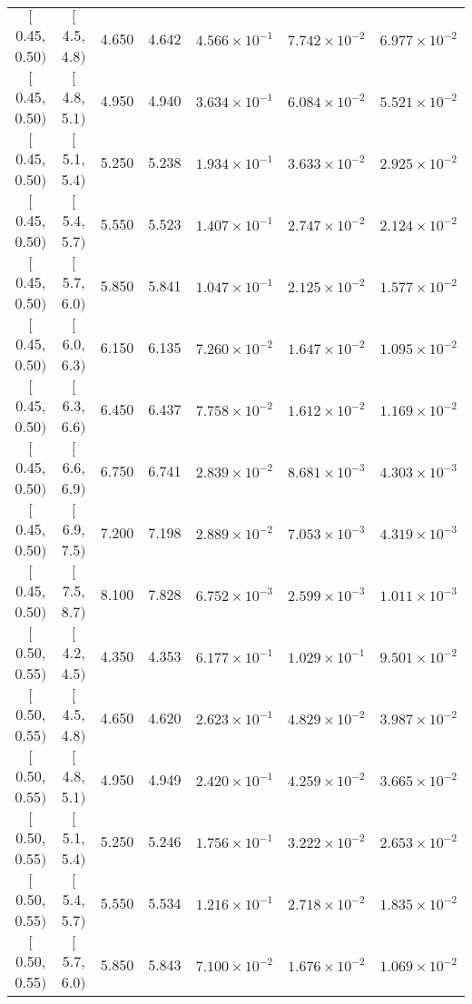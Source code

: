 \begin{longtable}{| c | c | c | c | c | c | c |}
$[$0.45, 0.50$)$ & $[$4.5, 4.8$)$ & 4.650 & 4.642 & $4.566 \times 10^{-1}$ & $7.742 \times 10^{-2}$ & $6.977 \times 10^{-2}$ \\
$[$0.45, 0.50$)$ & $[$4.8, 5.1$)$ & 4.950 & 4.940 & $3.634 \times 10^{-1}$ & $6.084 \times 10^{-2}$ & $5.521 \times 10^{-2}$ \\
$[$0.45, 0.50$)$ & $[$5.1, 5.4$)$ & 5.250 & 5.238 & $1.934 \times 10^{-1}$ & $3.633 \times 10^{-2}$ & $2.925 \times 10^{-2}$ \\
$[$0.45, 0.50$)$ & $[$5.4, 5.7$)$ & 5.550 & 5.523 & $1.407 \times 10^{-1}$ & $2.747 \times 10^{-2}$ & $2.124 \times 10^{-2}$ \\
$[$0.45, 0.50$)$ & $[$5.7, 6.0$)$ & 5.850 & 5.841 & $1.047 \times 10^{-1}$ & $2.125 \times 10^{-2}$ & $1.577 \times 10^{-2}$ \\
$[$0.45, 0.50$)$ & $[$6.0, 6.3$)$ & 6.150 & 6.135 & $7.260 \times 10^{-2}$ & $1.647 \times 10^{-2}$ & $1.095 \times 10^{-2}$ \\
$[$0.45, 0.50$)$ & $[$6.3, 6.6$)$ & 6.450 & 6.437 & $7.758 \times 10^{-2}$ & $1.612 \times 10^{-2}$ & $1.169 \times 10^{-2}$ \\
$[$0.45, 0.50$)$ & $[$6.6, 6.9$)$ & 6.750 & 6.741 & $2.839 \times 10^{-2}$ & $8.681 \times 10^{-3}$ & $4.303 \times 10^{-3}$ \\
$[$0.45, 0.50$)$ & $[$6.9, 7.5$)$ & 7.200 & 7.198 & $2.889 \times 10^{-2}$ & $7.053 \times 10^{-3}$ & $4.319 \times 10^{-3}$ \\
$[$0.45, 0.50$)$ & $[$7.5, 8.7$)$ & 8.100 & 7.828 & $6.752 \times 10^{-3}$ & $2.599 \times 10^{-3}$ & $1.011 \times 10^{-3}$ \\
\hline
$[$0.50, 0.55$)$ & $[$4.2, 4.5$)$ & 4.350 & 4.353 & $6.177 \times 10^{-1}$ & $1.029 \times 10^{-1}$ & $9.501 \times 10^{-2}$ \\
$[$0.50, 0.55$)$ & $[$4.5, 4.8$)$ & 4.650 & 4.620 & $2.623 \times 10^{-1}$ & $4.829 \times 10^{-2}$ & $3.987 \times 10^{-2}$ \\
$[$0.50, 0.55$)$ & $[$4.8, 5.1$)$ & 4.950 & 4.949 & $2.420 \times 10^{-1}$ & $4.259 \times 10^{-2}$ & $3.665 \times 10^{-2}$ \\
$[$0.50, 0.55$)$ & $[$5.1, 5.4$)$ & 5.250 & 5.246 & $1.756 \times 10^{-1}$ & $3.222 \times 10^{-2}$ & $2.653 \times 10^{-2}$ \\
$[$0.50, 0.55$)$ & $[$5.4, 5.7$)$ & 5.550 & 5.534 & $1.216 \times 10^{-1}$ & $2.718 \times 10^{-2}$ & $1.835 \times 10^{-2}$ \\
$[$0.50, 0.55$)$ & $[$5.7, 6.0$)$ & 5.850 & 5.843 & $7.100 \times 10^{-2}$ & $1.676 \times 10^{-2}$ & $1.069 \times 10^{-2}$ \\

\end{longtable}
